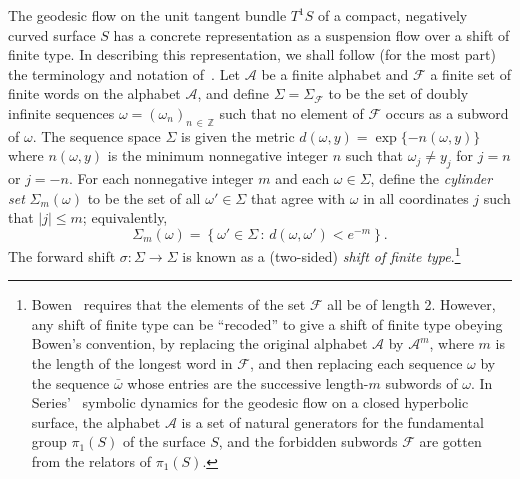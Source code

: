 \documentclass[10pt]{amsart}
\theoremstyle{definition}\newtheorem{defi}[theo]{Definition}\newtheorem{rema}[theo]{Remark}\newtheorem{exam}[theo]{Example}\newtheorem{exem}[theo]{Example}\newtheorem{nota}[theo]{Notation}
\newcommand{\xset}[1]{\left\{ #1 \right\}}
\newcommand{\zz}[1]{\mathbb #1}
\begin{document}
The geodesic flow on the unit tangent bundle $T^1S$ of a compact, negatively curved surface $S$ has a concrete representation as a suspension flow over a shift of finite type. In describing this representation, we shall follow (for the most part) the terminology and notation of~\cite{bowen:book,lalley:duke,series:symbDynFlows}. Let $\mathcal{A}$ be a finite alphabet and $\mathcal{F}$ a finite set of finite words on the alphabet $\mathcal{A}$, and define $\Sigma =\Sigma_{\mathcal{F}}$ to be the set of doubly infinite sequences $\omega = (\omega_{n})_{n\,\in\, \zz{Z}}$ such that no element of $\mathcal{F}$ occurs as a subword of $\omega$. The sequence space $\Sigma $ is given the metric $d (\omega,y)=\exp \{-n (\omega,y) \}$ where $n (\omega,y)$ is the minimum nonnegative integer $n$ such that $\omega_{j}\not =y_{j}$ for $j= n$ or $j=-n$. For each nonnegative integer $m$ and each $\omega \in \Sigma$, define the \emph{cylinder set} $\Sigma_{m}(\omega) $ to be the set of all $\omega'\in\Sigma$ that agree with $\omega$ in all coordinates $j$ such that $|j| \leq m$; equivalently,
\begin{equation}\label{eq:cylinder}
\Sigma_{m}(\omega)= \xset {\omega' \in \Sigma \,:\, d(\omega,\omega')< e^{-m}}.
\end{equation}
The forward shift $\sigma :\Sigma \rightarrow \Sigma$ is known as a (two-sided) \emph{shift of finite type}.\footnote{Bowen~\cite{bowen:book} requires that the elements of the set $\mathcal{F}$ all be of length 2. However, any shift of finite type can be ``recoded'' to give a shift of finite type obeying Bowen's convention, by replacing the original alphabet $\mathcal{A}$ by $\mathcal{A}^{m}$, where $m$ is the length of the longest word in $\mathcal{F}$, and then replacing each sequence $\omega $ by the sequence $\bar{\omega}$ whose entries are the successive length-$m$ subwords of $\omega$. In Series'~\cite{series:symbDynFlows} symbolic dynamics for the geodesic flow on a closed hyperbolic surface, the alphabet $\mathcal{A}$ is a set of natural generators for the fundamental group $\pi_{1} (S)$ of the surface $S$, and the forbidden subwords $\mathcal{F}$ are gotten from the relators of $\pi_{1} (S)$.}
\end{document}
